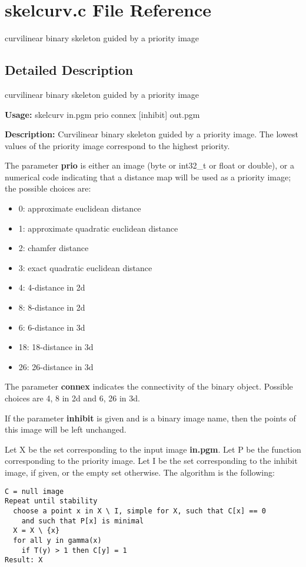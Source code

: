 \section{skelcurv.c File Reference}
\label{skelcurv_8c}
curvilinear binary skeleton guided by a priority image 



\subsection{Detailed Description}
curvilinear binary skeleton guided by a priority image 

{\bf Usage:} skelcurv in.pgm prio connex [inhibit] out.pgm

{\bf Description:} Curvilinear binary skeleton guided by a priority image. The lowest values of the priority image correspond to the highest priority.

The parameter {\bf prio} is either an image (byte or int32\_\-t or float or double), or a numerical code indicating that a distance map will be used as a priority image; the possible choices are: \begin{itemize}
\item 0: approximate euclidean distance \item 1: approximate quadratic euclidean distance \item 2: chamfer distance \item 3: exact quadratic euclidean distance \item 4: 4-distance in 2d \item 8: 8-distance in 2d \item 6: 6-distance in 3d \item 18: 18-distance in 3d \item 26: 26-distance in 3d\end{itemize}
The parameter {\bf connex} indicates the connectivity of the binary object. Possible choices are 4, 8 in 2d and 6, 26 in 3d.

If the parameter {\bf inhibit} is given and is a binary image name, then the points of this image will be left unchanged.

Let X be the set corresponding to the input image {\bf in.pgm}. Let P be the function corresponding to the priority image. Let I be the set corresponding to the inhibit image, if given, or the empty set otherwise. The algorithm is the following:



\footnotesize\begin{verbatim}C = null image
Repeat until stability
  choose a point x in X \ I, simple for X, such that C[x] == 0 
    and such that P[x] is minimal
  X = X \ {x}
  for all y in gamma(x)
    if T(y) > 1 then C[y] = 1
Result: X
\end{verbatim}
\normalsize


